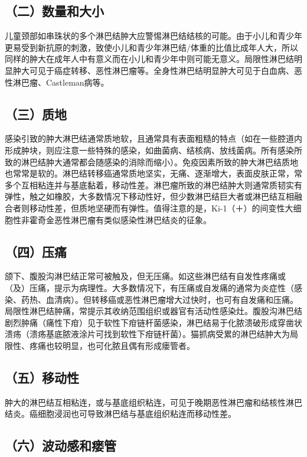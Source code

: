 \subsection{（二）数量和大小}

儿童颈部如串珠状的多个淋巴结肿大应警惕淋巴结结核的可能。由于小儿和青少年更易受到新抗原的刺激，致使小儿和青少年淋巴结/体重的比值比成年人大，所以同样的肿大在成年人中有意义而在小儿和青少年中则可能无意义。局限性淋巴结明显肿大可见于癌症转移、恶性淋巴瘤等。全身性淋巴结明显肿大可见于白血病、恶性淋巴瘤、Castleman病等。

\subsection{（三）质地}

感染引致的肿大淋巴结通常质地软，且通常具有表面粗糙的特点（如在一些腔道内形成肿块，则应注意一些特殊的感染，如曲菌病、结核病、放线菌病。所有感染所致的淋巴结肿大通常都会随感染的消除而缩小）。免疫因素所致的肿大淋巴结质地也常常是软的。淋巴结转移癌通常质地坚实，无痛、逐渐增大，表面皮肤正常，常多个互相粘连并与基底黏着，移动性差。淋巴瘤所致的淋巴结肿大则通常质韧实有弹性，触之如橡胶，大多数情况下移动性好，但少数淋巴结巨大者或淋巴结互相融合者则移动性差，但质地坚硬而有弹性。值得注意的是，Ki-1（＋）的间变性大细胞性非霍奇金恶性淋巴瘤有类似感染性淋巴结炎的征象。

\subsection{（四）压痛}

颌下、腹股沟淋巴结正常可被触及，但无压痛。如这些淋巴结有自发性疼痛或（及）压痛，提示为病理性。大多数情况下，有压痛或自发痛的通常为炎症性（感染、药热、血清病）。但转移癌或恶性淋巴瘤增大过快时，也可有自发痛和压痛。局限性淋巴结肿痛，常提示其收纳范围组织或器官有活动性感染灶。腹股沟淋巴结剧烈肿痛（痛性下疳）见于软性下疳链杆菌感染，淋巴结易于化脓溃破形成穿凿状溃疡（溃疡基底脓液涂片可找到软性下疳链杆菌）。猫抓病受累的淋巴结肿大为局限性、疼痛也较明显，也可化脓且偶有形成瘘管者。

\subsection{（五）移动性}

肿大的淋巴结互相粘连，或与基底组织粘连，可见于晚期恶性淋巴瘤和结核性淋巴结炎。癌细胞浸润也可导致淋巴结与基底组织粘连而移动性差。

\subsection{（六）波动感和瘘管}

